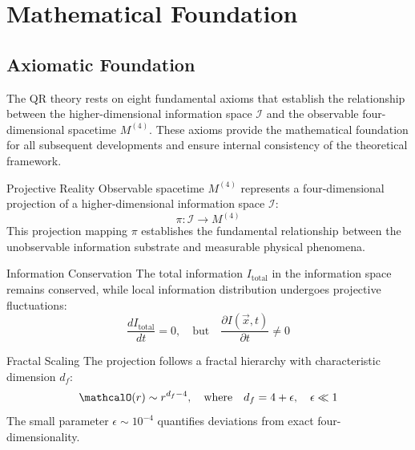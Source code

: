 \section{Mathematical Foundation}
\label{sec:mathematical-foundation}

\subsection{Axiomatic Foundation}
\label{subsec:axiomatic-foundation}

The QR theory rests on eight fundamental axioms that establish the relationship between the higher-dimensional information space $\mathcal{I}$ and the observable four-dimensional spacetime $M^{(4)}$. These axioms provide the mathematical foundation for all subsequent developments and ensure internal consistency of the theoretical framework.

\begin{qraxiom}{Projective Reality}
Observable spacetime $M^{(4)}$ represents a four-dimensional projection of a higher-dimensional information space $\mathcal{I}$:
\begin{equation}
\pi: \mathcal{I} \rightarrow M^{(4)}
\label{eq:axiom1}
\end{equation}
This projection mapping $\pi$ establishes the fundamental relationship between the unobservable information substrate and measurable physical phenomena.
\end{qraxiom}

\begin{qraxiom}{Information Conservation}
The total information $I_{\text{total}}$ in the information space remains conserved, while local information distribution undergoes projective fluctuations:
\begin{equation}
\frac{dI_{\text{total}}}{dt} = 0, \quad \text{but} \quad \frac{\partial I(\vec{x},t)}{\partial t} \neq 0
\label{eq:axiom2}
\end{equation}
\end{qraxiom}

\begin{qraxiom}{Fractal Scaling}
The projection follows a fractal hierarchy with characteristic dimension $d_f$:
\begin{equation}
\mathcalO(r) \sim r^{d_f-4}, \quad \text{where} \quad d_f = 4 + \epsilon, \quad \epsilon \ll 1
\label{eq:axiom3}
\end{equation}
The small parameter $\epsilon \sim 10^{-4}$ quantifies deviations from exact four-dimensionality.
\end{qraxiom}

